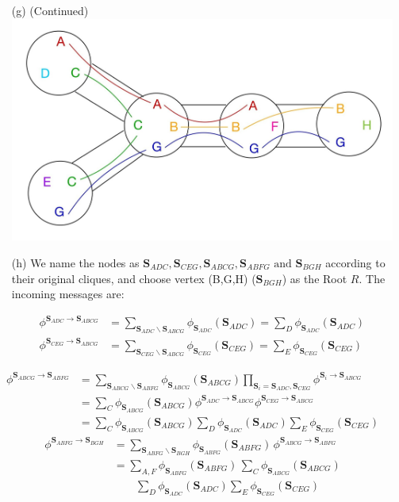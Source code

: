 \documentclass[11pt]{article}
\renewcommand{\vec}[1]{\mathbf{#1}}
\begin{document}
\begin{answertext}{23cm}{}

\begin{itemize}
\item[(g)] (Continued)\\
\includegraphics[scale=0.23]{tree}
\item[(h)] We name the nodes as $\vec{S}_{ADC},\vec{S}_{CEG},\vec{S}_{ABCG},\vec{S}_{ABFG}\text{ and }\vec{S}_{BGH}$ according to their original cliques, and choose vertex (B,G,H) ($\vec{S}_{BGH}$) as the Root $R$. The incoming messages are:

\begin{align*}
\phi^{\vec{S}_{ADC}\to\vec{S}_{ABCG}}&=\sum_{\vec{S}_{ADC}\backslash \vec{S}_{ABCG}}\phi_{\vec{S}_{ADC}}(\vec{S}_{ADC}) = \sum_{D}\phi_{\vec{S}_{ADC}}(\vec{S}_{ADC})\\
\phi^{\vec{S}_{CEG}\to\vec{S}_{ABCG}}&=\sum_{\vec{S}_{CEG}\backslash \vec{S}_{ABCG}}\phi_{\vec{S}_{CEG}}(\vec{S}_{CEG}) = \sum_{E}\phi_{\vec{S}_{CEG}}(\vec{S}_{CEG})
\end{align*}
\end{itemize}
\begin{align*}
\phi^{\vec{S}_{ABCG}\to\vec{S}_{ABFG}}&=\sum_{\vec{S}_{ABCG}\backslash \vec{S}_{ABFG}}\phi_{\vec{S}_{ABCG}}(\vec{S}_{ABCG})\prod_{\vec{S}_i=\vec{S}_{ADC},\vec{S}_{CEG}}\phi^{\vec{S}_i\to\vec{S}_{ABCG}}\\
&= \sum_{C}\phi_{\vec{S}_{ABCG}}(\vec{S}_{ABCG})\phi^{\vec{S}_{ADC}\to\vec{S}_{ABCG}}\phi^{\vec{S}_{CEG}\to\vec{S}_{ABCG}}\\
&= \sum_{C}\phi_{\vec{S}_{ABCG}}(\vec{S}_{ABCG})\sum_{D}\phi_{\vec{S}_{ADC}}(\vec{S}_{ADC})\sum_{E}\phi_{\vec{S}_{CEG}}(\vec{S}_{CEG})
\end{align*}
\begin{align*}
\phi^{\vec{S}_{ABFG}\to\vec{S}_{BGH}} &= \sum_{\vec{S}_{ABFG}\backslash\vec{S}_{BGH}} \phi_{\vec{S}_{ABFG}}(\vec{S}_{ABFG}) \,\phi^{\vec{S}_{ABCG}\to\vec{S}_{ABFG}} \\
&= \sum_{A,F} \phi_{\vec{S}_{ABFG}}(\vec{S}_{ABFG}) \,\sum_{C}\phi_{\vec{S}_{ABCG}}(\vec{S}_{ABCG})\\
&\qquad\sum_{D}\phi_{\vec{S}_{ADC}}(\vec{S}_{ADC})\sum_{E}\phi_{\vec{S}_{CEG}}(\vec{S}_{CEG})
\end{align*}
\end{answertext}
\end{document}

